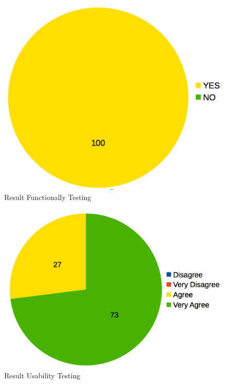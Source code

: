 \documentclass[conference, letterpaper]{IEEEtran}
\begin{document}
\begin{figure}[!t]
\centering
\includegraphics[scale=0.5]{image/functionally.png}
\caption{Result Functionally Testing}
\end{figure}

\begin{figure}[!t]
\centering
\includegraphics[scale=0.4]{image/usability.png}
\caption{Result Usability Testing}
\end{figure}
\end{document}
